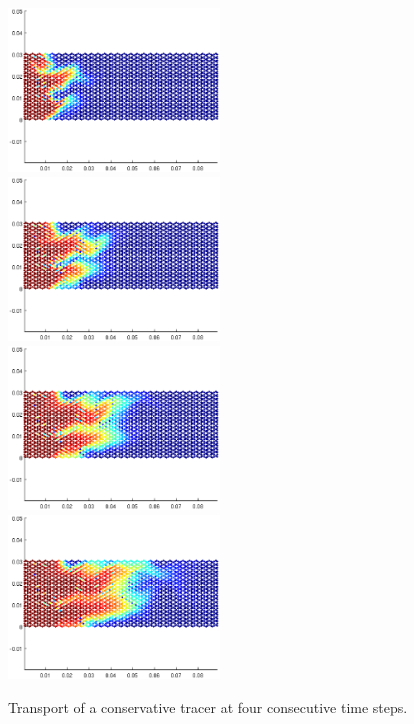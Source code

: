 \documentclass[12pt]{report}
\begin{document}
\begin{figure}[ht]
	\subfigure
	{\includegraphics[width=0.5\textwidth]{MainPoreNetwork_04}}\hfill
	\subfigure
	{\includegraphics[width=0.5\textwidth]{MainPoreNetwork_05}}\\
	\subfigure
	{\includegraphics[width=0.5\textwidth]{MainPoreNetwork_06}}\hfill
	\subfigure
	{\includegraphics[width=0.5\textwidth]{MainPoreNetwork_07}}
	\caption{Transport of a conservative tracer at four consecutive time steps.}
	\label{fig:transport}
\end{figure}
\end{document}
